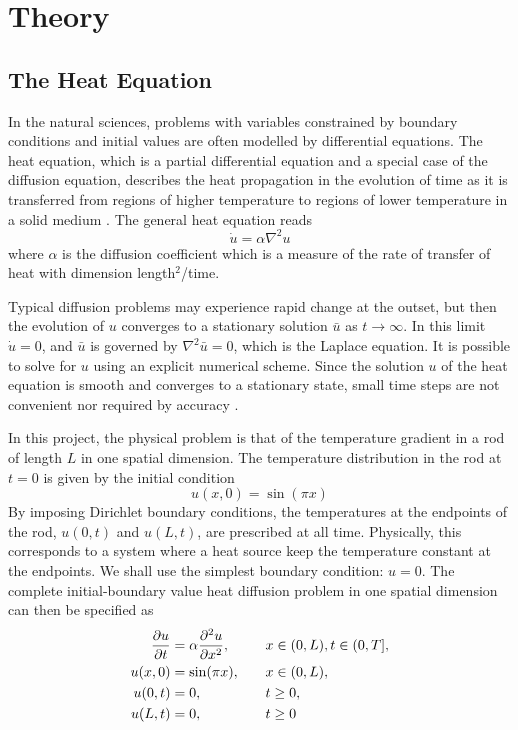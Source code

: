 \section{Theory}\label{sec:Theory}

\subsection{The Heat Equation}\label{sec:Heat eq Theory}
In the natural sciences, problems with variables constrained by boundary conditions and initial values are often modelled by differential equations. The heat equation, which is a partial differential equation and a special case of the diffusion equation, describes the heat propagation in the evolution of time as it is transferred from regions of higher temperature to regions of lower temperature in a solid medium \cite{hpl}. The general heat equation reads
\begin{equation}\label{eq:heq general}
    \dot{u} = \alpha \nabla^2 u
\end{equation}
where $\alpha$ is the diffusion coefficient which is a measure of the rate of transfer of heat with dimension length$^2$/time. 

Typical diffusion problems may experience rapid change at the outset, but then the evolution of $u$ converges to a stationary solution $\bar{u}$ as $t \to \infty$. In this limit $\dot{u}=0$, and $\bar{u}$ is governed by $\nabla^2 \bar{u}=0$, which is the Laplace equation. It is possible to solve for $u$ using an explicit numerical scheme. Since the solution $u$ of the heat equation is smooth and converges to a stationary state, small time steps are not convenient nor required by accuracy \cite{hpl}.

In this project, the physical problem is that of the temperature gradient in a rod of length $L$ in one spatial dimension. The temperature distribution in the rod at $t=0$ is given by the initial condition
\begin{equation*}
    u(x,0) = \sin(\pi x)
\end{equation*} 
By imposing Dirichlet boundary conditions, the temperatures at the endpoints of the rod, $u(0,t)$ and $u(L,t)$, are prescribed at all time. Physically, this corresponds to a system where a heat source keep the temperature constant at the endpoints. We shall use the simplest boundary condition: $u=0$. The complete initial-boundary value heat diffusion problem in one spatial dimension can then be specified as
\begin{alignat}{2}
    \pdv{u}{t} &= \alpha \pdv[2]{u}{x}, \quad &&x \in (0,L), t\in (0, T], \label{eq:heat eq 1D}\\
    u(x,0) &= \sin(\pi x), \quad &&x\in (0,L), \\
    u(0,t) &= 0, \quad &&t \geq 0, \\
    u(L,t) &= 0, \quad &&t \geq 0
\end{alignat}

